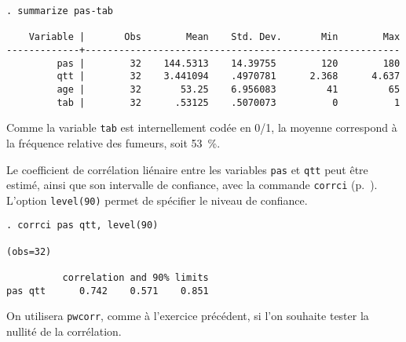 \begin{verbatim}
. summarize pas-tab

    Variable |       Obs        Mean    Std. Dev.       Min        Max
-------------+--------------------------------------------------------
         pas |        32    144.5313    14.39755        120        180
         qtt |        32    3.441094    .4970781      2.368      4.637
         age |        32       53.25    6.956083         41         65
         tab |        32      .53125    .5070073          0          1
\end{verbatim}
Comme la variable \texttt{tab} est internellement codée en 0/1, la moyenne
correspond à la fréquence relative des fumeurs, soit 53~\%.

Le coefficient de corrélation liénaire entre les variables \texttt{pas} et
\texttt{qtt} peut être estimé, ainsi que son intervalle de confiance, avec
la commande \texttt{corrci} (p.~\pageref{cmd:corrci}). L'option
\texttt{level(90)} permet de spécifier le niveau de confiance.
\begin{verbatim}
. corrci pas qtt, level(90)

(obs=32)

          correlation and 90% limits
pas qtt      0.742    0.571    0.851
\end{verbatim}
On utilisera \verb|pwcorr|, comme à l'exercice précédent, si l'on souhaite
tester la nullité de la corrélation.

